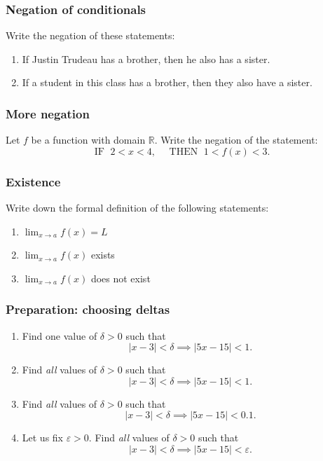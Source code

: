 \documentclass[14pt]{beamer}
\begin{document}
\begin{frame}
	\frametitle{Negation of conditionals}

	Write the negation of these statements:
	\begin{enumerate}
		\item If Justin Trudeau has a brother, then he also has a sister.

		\item If a student in this class has a brother, then they also have a sister.
	\end{enumerate}
\end{frame}

\begin{frame}
	\frametitle{More negation}

	Let $f$ be a function with domain $\mathbb{R}$. Write the negation of the statement:
	\begin{equation*}
		\text{IF }\; 2<x<4, \quad \text{ THEN }\; 1<f(x)<3.
	\end{equation*}
\end{frame}

\begin{frame}
	\frametitle{Existence}

	Write down the formal definition of the following statements:

	\vfill
	\begin{enumerate}
		\item $\displaystyle \lim_{x \to a}f(x) = L$
			\vfill

		\item $\displaystyle \lim_{x \to a}f(x)$ exists

			\vfill

		\item $\displaystyle \lim_{x \to a}f(x)$ does not exist
	\end{enumerate}

	\vfill
\end{frame}

\begin{frame}[t]
	\frametitle{Preparation: choosing deltas}

	\begin{enumerate}
		\item Find one value of $\delta >0$ such that
			\[
				|x-3|< \delta \implies |5x-15|<1.
			\]

		\item Find \emph{all} values of $\delta >0$ such that
			\[
				|x-3|< \delta \implies |5x-15|<1.
			\]

		\item Find \emph{all} values of $\delta >0$ such that
			\[
				|x-3|< \delta \implies |5x-15|<0.1.
			\]

		\item Let us fix $\varepsilon >0$. Find \emph{all} values of $\delta >0$ such
			that
			\[
				|x-3|< \delta \implies |5x-15|<\varepsilon.
			\]
	\end{enumerate}
\end{frame}
\end{document}
